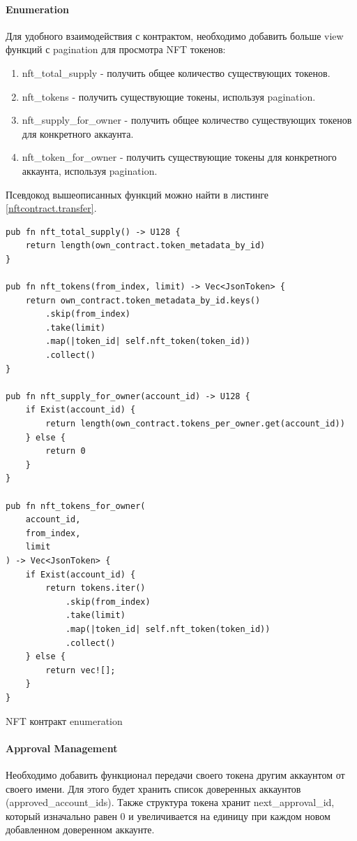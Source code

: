 \paragraph{Enumeration}
Для удобного взаимодействия с контрактом, необходимо добавить больше view функций с pagination для просмотра NFT токенов\cite{enumstandard}:
\begin{enumerate}
\item nft\_total\_supply - получить общее количество существующих токенов.
\item nft\_tokens - получить существующие токены, используя pagination.
\item nft\_supply\_for\_owner - получить общее количество существующих токенов для конкретного аккаунта.
\item nft\_token\_for\_owner - получить существующие токены для конкретного аккаунта, используя pagination.
\end{enumerate}

Псевдокод вышеописанных функций можно найти в листинге {\color{blue}\ref{nftcontract.transfer}}.

\begin{listing}
\begin{verbatim}
pub fn nft_total_supply() -> U128 {
    return length(own_contract.token_metadata_by_id)
}

pub fn nft_tokens(from_index, limit) -> Vec<JsonToken> {
    return own_contract.token_metadata_by_id.keys()
        .skip(from_index)
        .take(limit)
        .map(|token_id| self.nft_token(token_id))
        .collect()
}

pub fn nft_supply_for_owner(account_id) -> U128 {
    if Exist(account_id) {
        return length(own_contract.tokens_per_owner.get(account_id))
    } else {
        return 0
    }
}

pub fn nft_tokens_for_owner(
    account_id,
    from_index,
    limit
) -> Vec<JsonToken> {
    if Exist(account_id) {
        return tokens.iter()
            .skip(from_index)
            .take(limit)
            .map(|token_id| self.nft_token(token_id))
            .collect()
    } else {
        return vec![];
    }
}
\end{verbatim}
\caption{NFT контракт enumeration}
\label{nftcontract.transfer}
\end{listing}

\paragraph{Approval Management}
Необходимо добавить функционал передачи своего токена другим аккаунтом от своего имени\cite{approvalstandard}. Для этого будет хранить список доверенных аккаунтов (approved\_account\_ids).
Также структура токена хранит next\_approval\_id, который изначально равен 0 и увеличивается на единицу при каждом новом добавленном доверенном аккаунте.

